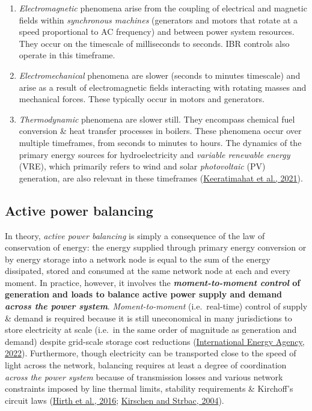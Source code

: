 \documentclass[12pt,a4paper,]{report}
\begin{document}
\begin{enumerate}
\def\labelenumi{\arabic{enumi}.}
\item
  \emph{Electromagnetic} phenomena arise from the coupling of electrical
  and magnetic fields within \emph{synchronous machines} (generators and
  motors that rotate at a speed proportional to AC frequency) and
  between power system resources. They occur on the timescale of
  milliseconds to seconds. IBR controls also operate in this timeframe.
\item
  \emph{Electromechanical} phenomena are slower (seconds to minutes
  timescale) and arise as a result of electromagnetic fields interacting
  with rotating masses and mechanical forces. These typically occur in
  motors and generators.
\item
  \emph{Thermodynamic} phenomena are slower still. They encompass
  chemical fuel conversion \& heat transfer processes in boilers. These
  phenomena occur over multiple timeframes, from seconds to minutes to
  hours. The dynamics of the primary energy sources for hydroelectricity
  and \emph{variable renewable energy} (VRE), which primarily refers to
  wind and solar \emph{photovoltaic} (PV) generation, are also relevant
  in these timeframes
  (\protect\hyperlink{ref-keeratimahatAnalysisShorttermOperational2021}{Keeratimahat
  et al., 2021}).
\end{enumerate}

\hypertarget{sec:lit_review-balancing}{%
\subsection{Active power balancing}\label{sec:lit_review-balancing}}

In theory, \emph{active power balancing} is simply a consequence of the
law of conservation of energy: the energy supplied through primary
energy conversion or by energy storage into a network node is equal to
the sum of the energy dissipated, stored and consumed at the same
network node at each and every moment. In practice, however, it involves
the \textbf{\emph{moment-to-moment control} of generation and loads to
balance active power supply and demand \emph{across the power system}}.
\emph{Moment-to-moment} (i.e.~real-time) control of supply \& demand is
required because it is still uneconomical in many jurisdictions to store
electricity at scale (i.e.~in the same order of magnitude as generation
and demand) despite grid-scale storage cost reductions
(\protect\hyperlink{ref-internationalenergyagencyGridScaleStorage2022}{International
Energy Agency, 2022}). Furthermore, though electricity can be
transported close to the speed of light across the network, balancing
requires at least a degree of coordination \emph{across the power
system} because of transmission losses and various network constraints
imposed by line thermal limits, stability requirements \& Kirchoff's
circuit laws (\protect\hyperlink{ref-hirthWhyWindNot2016a}{Hirth et al.,
2016};
\protect\hyperlink{ref-kirschenFundamentalsPowerSystem2004}{Kirschen and
Strbac, 2004}).
\end{document}
